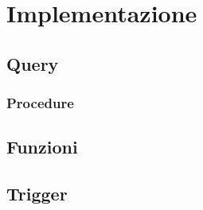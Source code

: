 \section{Implementazione}




\subsection{Query} %
\subsubsection{Procedure}

\subsection{Funzioni} %
\subsection{Trigger} %
